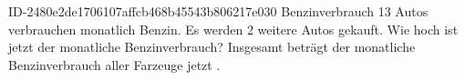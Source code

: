 \begin{exercise}
      {ID-2480e2de1706107affcb468b45543b806217e030}
      {Benzinverbrauch}
  \ifproblem\problem
    \num{13} Autos verbrauchen monatlich  Benzin. Es werden \num{2} weitere Autos
    gekauft. Wie hoch ist jetzt der monatliche Benzinverbrauch?
  \fi
  \ifoutcome\outcome
    Insgesamt beträgt der monatliche Benzinverbrauch aller Farzeuge jetzt .
  \fi
\end{exercise}
